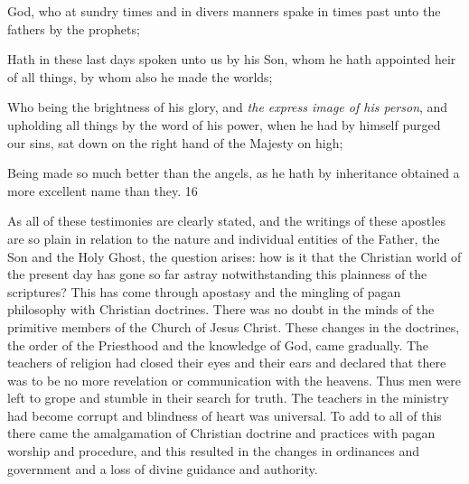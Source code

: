 God, who at sundry times and in divers manners spake in times past unto the fathers by the
prophets;

Hath in these last days spoken unto us by his Son, whom he hath appointed heir of all things,
by whom also he made the worlds;

Who being the brightness of his glory, and \textit{the express image of his person}, and upholding all
things by the word of his power, when he had by himself purged our sins, sat down on the
right hand of the Majesty on high;

Being made so much better than the angels, as he hath by inheritance obtained a more
excellent name than they. 16

As all of these testimonies are clearly stated, and the writings of these apostles are so plain in
relation to the nature and individual entities of the Father, the Son and the Holy Ghost, the
question arises: how is it that the Christian world of the present day has gone so far astray
notwithstanding this plainness of the scriptures? This has come through apostasy and the
mingling of pagan philosophy with Christian doctrines. There was no doubt in the minds of
the primitive members of the Church of Jesus Christ. These changes in the doctrines, the
order of the Priesthood and the knowledge of God, came gradually. The teachers of religion
had closed their eyes and their ears and declared that there was to be no more revelation or
communication with the heavens. Thus men were left to grope and stumble in their search for
truth. The teachers in the ministry had become corrupt and blindness of heart was universal.
To add to all of this there came the amalgamation of Christian doctrine and practices with
pagan worship and procedure, and this resulted in the changes in ordinances and government
and a loss of divine guidance and authority.

